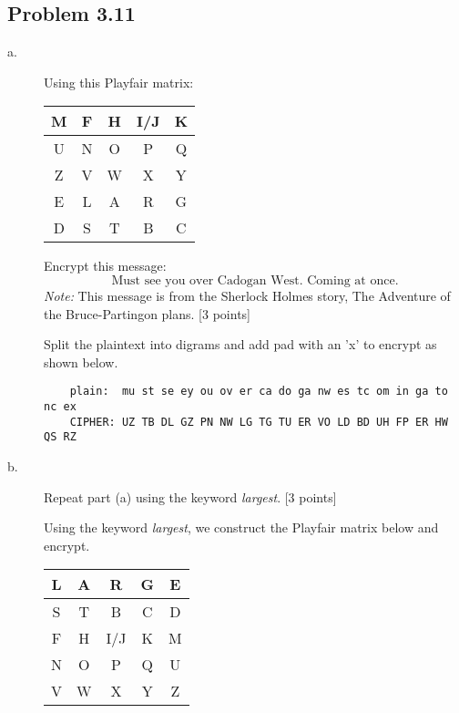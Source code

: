 \documentclass[../hw_sols.tex]{subfiles}
\begin{document}
\newpage



\subsection*{Problem 3.11}

\begin{description}

\item[a.] Using this Playfair matrix:
	\begin{center}
	\begin{tabular}{ | c | c | c | c | c | }
		\hline
		M & F & H & I/J & K \\
		\hline
		U & N & O &   P & Q \\
		\hline
		Z & V & W &   X & Y \\
		\hline
		E & L & A &   R & G \\
		\hline
		D & S & T &   B & C \\
		\hline
	\end{tabular}
	\end{center}

\noindent Encrypt this message:
	$$\text{Must see you over Cadogan West. Coming at once.}$$
\textit{Note:} This message is from the Sherlock Holmes story, The 
Adventure of the Bruce-Partingon plans. [3 points]

\begin{solution}
Split the plaintext into digrams and add pad with an 'x' to encrypt as shown 
below.
\begin{verbatim}
    plain:  mu st se ey ou ov er ca do ga nw es tc om in ga to nc ex
    CIPHER: UZ TB DL GZ PN NW LG TG TU ER VO LD BD UH FP ER HW QS RZ
\end{verbatim}
\end{solution}


\item[b.] Repeat part (a) using the keyword \textit{largest}. [3 points]

\begin{solution}

Using the keyword \textit{largest}, we construct the Playfair matrix below 
and encrypt.
	\begin{center}
	\begin{tabular}{ | c | c | c | c | c | }
		\hline \rowcolor{cyan!40}
		L & A & R & G & E \\
		\hline
		S \cellcolor{cyan!40} & T \cellcolor{cyan!40} & B & C & D\\
		\hline
		F & H & I/J & K & M\\
		\hline
		N & O &   P & Q & U\\
		\hline
		V & W &   X & Y & Z\\
		\hline
	\end{tabular}
	\end{center}


\end{solution}
\end{description}
\end{document}
